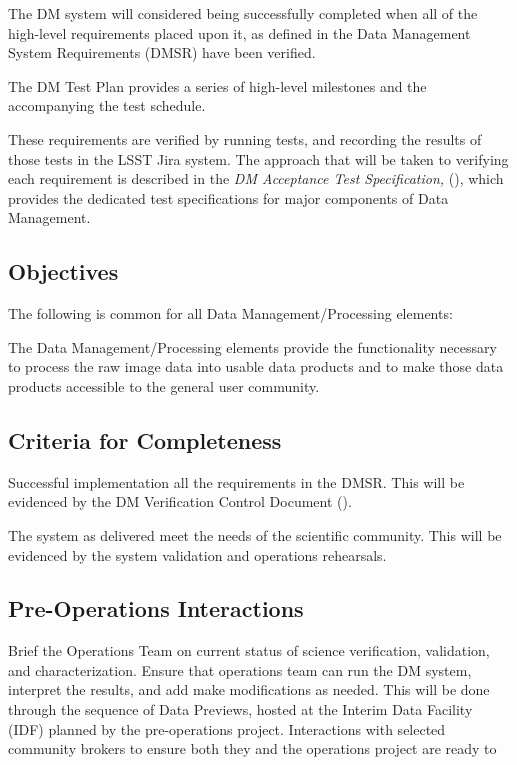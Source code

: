 The DM system will considered being successfully completed when all of the high-level requirements placed upon it, as defined in  the Data Management System Requirements (DMSR) have been verified. 

The DM Test Plan provides a series of high-level milestones and the accompanying the test schedule. 

These requirements are verified by running tests, and recording the results of those tests in the LSST Jira system. 
The approach that will be taken to verifying each requirement is described in the {\it DM Acceptance Test Specification,} (), which provides the dedicated test specifications for major components of Data Management.



\subsection{Objectives}
The following is common for all Data Management/Processing elements:

The Data Management/Processing elements provide the functionality necessary to process the raw image data into usable data products and to make those data products accessible to the general user community.

\subsection{Criteria for Completeness} 
Successful implementation all the requirements in the DMSR. 
This will be evidenced by the DM Verification Control Document ().

The system as delivered meet the needs of the scientific community. 
This will be evidenced by the system validation and operations rehearsals. 

\subsection{Pre-Operations Interactions}

Brief the Operations Team on current status of science verification, validation, and characterization.
Ensure that operations team can run the DM system, interpret the results, and add make modifications as needed. 
This will be done through the sequence of Data Previews,  hosted at the Interim Data Facility (IDF) planned by the pre-operations project. 
Interactions with selected community brokers to ensure both they and the operations project are ready to 

